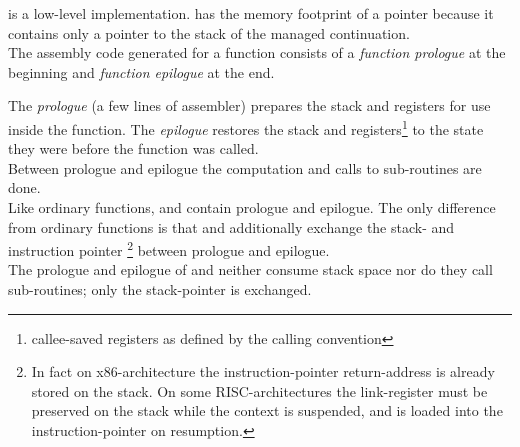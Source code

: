 
\cc is a low-level implementation. \cont has the memory footprint of a pointer
because it contains only a pointer to the stack of the managed continuation.\\
\newline
The assembly code generated for a function consists of a \emph{function prologue} at the
beginning and \emph{function epilogue} at the end.

The \emph{prologue} (a few lines of assembler) prepares the stack and
registers for use inside the function. The \emph{epilogue} restores the stack
and registers\footnote{callee-saved registers as defined by the calling
convention} to the state they were before the function was called.\\
Between prologue and epilogue the computation and calls to sub-routines are
done.\\
\newline
Like ordinary functions, \resume and \resumewith contain prologue and
epilogue. The only difference from ordinary functions is that \resume and
\resumewith additionally exchange the stack- and instruction pointer
\footnote{In fact on x86-architecture the instruction-pointer return-address
is already stored on the stack. On some RISC-architectures the link-register
must be preserved on the stack while the context is suspended, and is loaded
into the instruction-pointer on resumption.} between prologue and epilogue.\\
The prologue and epilogue of \resume and \resumewith neither consume stack space
nor do they call sub-routines; only the stack-pointer is exchanged.
